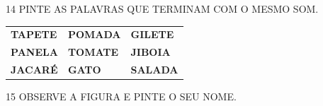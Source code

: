 


\num{14} PINTE AS PALAVRAS QUE TERMINAM COM O MESMO SOM.

\begin{longtable}[]{@{}lll@{}}
\toprule
\textbf{TAPETE} & \textbf{POMADA} & \textbf{GILETE}\tabularnewline
\textbf{PANELA} & \textbf{TOMATE} & \textbf{JIBOIA}\tabularnewline
\textbf{JACARÉ} & \textbf{GATO} & \textbf{SALADA}\tabularnewline
\bottomrule
\end{longtable}

\num{15} OBSERVE A FIGURA E PINTE O SEU NOME.

